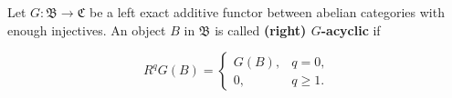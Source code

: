 Let $G: \mathfrak{B} \to \mathfrak{C}$ be a left exact additive functor between abelian categories with enough injectives. An object $B$ in $\mathfrak{B}$ is called \textbf{(right) $G$-acyclic} if

$$
R^q G(B) = \begin{cases}
G(B), & q = 0, \\
0, & q \geq 1.
\end{cases}
$$

